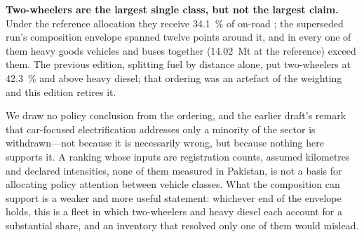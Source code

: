 \textbf{Two-wheelers are the largest single class, but not the largest claim.} Under the
reference allocation they receive \SI{34.1}{\percent} of on-road \COtwo{}; the
superseded run's composition envelope spanned twelve points around it, and in
every one of them heavy goods vehicles and buses together
(\SI{14.02}{\mega\tonne} at the reference) exceed them. The previous edition, splitting
fuel by distance alone, put two-wheelers at \SI{42.3}{\percent} and above heavy diesel;
that ordering was an artefact of the weighting and this edition retires it.

We draw no policy conclusion from the ordering, and the earlier draft's remark that
car-focused electrification addresses only a minority of the sector is withdrawn---not
because it is necessarily wrong, but because nothing here supports it. A ranking whose
inputs are registration counts, assumed kilometres and declared intensities, none of them
measured in Pakistan, is not a basis for allocating policy attention between vehicle
classes. What the composition can support is a weaker and more useful statement: whichever
end of the envelope holds, this is a fleet in which two-wheelers and heavy diesel each
account for a substantial share, and an inventory that resolved only one of them would
mislead.
